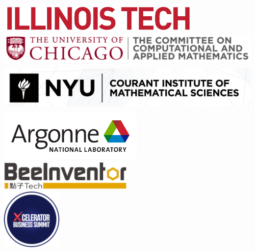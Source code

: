 \begin{center}
\includegraphics[height=1.5cm]{Photos/illinois_tech_logo_full.png} \\[1em]
\includegraphics[height=1.5cm]{Photos/uchicago_cam_logo.png} \\[1em]
\includegraphics[height=2.5cm]{Photos/nyu_courant_logo.png} \\[1em]
\includegraphics[height=2.5cm]{Photos/argonne_logo.png} \\[1em]
\includegraphics[height=1.5cm]{Photos/beeinventor_logo.png} \\[1em]
\includegraphics[height=3cm]{Photos/xcelerator_logo.png}

\end{center}
